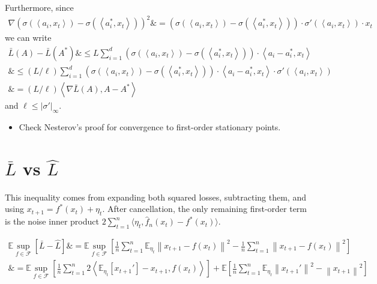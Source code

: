 \documentclass[11pt]{article}
\newcommand{\inner}[1]{\left\langle #1 \right\rangle}
\newcommand{\E}{\ensuremath{\mathbb E}}
\newcommand{\F}{\ensuremath{\mathcal F}}
\newcommand{\En}{\E}
\newcommand{\emploss}{\widehat{L}}
\newcommand{\condemploss}{\bar{L}}
\newcommand{\norm}[1]{\left\|#1\right\|}
\newcommand{\algo}{\widehat{f}_n}
\begin{document}
Furthermore, since
\begin{align}
	\nabla  (\sigma(\inner{a_i,x_t})-\sigma(\inner{a_i^*,x_t}))^2 
	\&=(\sigma(\inner{a_i,x_t})-\sigma(\inner{a_i^*,x_t})) \cdot \sigma'(\inner{a_i,x_t}) \cdot x_t 
\end{align}
we can write
\begin{align}
	\condemploss(A)-\condemploss(A^*) 
	\&\leq L \sum_{i=1}^d (\sigma(\inner{a_i,x_t})-\sigma(\inner{a_i^*,x_t})) \cdot \inner{a_i-a_i^*,x_t}\\
	\&\leq (L/\ell) \sum_{i=1}^d (\sigma(\inner{a_i,x_t})-\sigma(\inner{a_i^*,x_t})) \cdot \inner{a_i-a_i^*,x_t} \cdot \sigma'(\inner{a_i,x_t})\\
	\&= (L/\ell) \inner{\nabla \condemploss(A), A-A^*}
\end{align}
and $\ell \leq |\sigma'|_\infty$.

\begin{itemize}
	\item Check Nesterov's proof for convergence to first-order stationary points.
\end{itemize}

\section{$\condemploss$ vs $\emploss$}
%
This inequality comes from expanding both squared losses, subtracting them, and using \(x_{t+1}=f^*(x_t)+\eta_t\).
After cancellation, the only remaining first-order term is the noise inner product \(2\sum_{t=1}^n \langle \eta_t,\algo(x_t)-f^*(x_t)\rangle\).






\begin{align}
	\En\sup_{f\in\F}\left[\condemploss-\emploss\right] \&= \En\sup_{f\in\F}\left[\frac{1}{n}\sum_{t=1}^n \En_{\eta_t}\norm{x_{t+1}-f(x_t)}^2 - \frac{1}{n}\sum_{t=1}^n \norm{x_{t+1}-f(x_t)}^2 \right]\\
	\&=\En\sup_{f\in\F}\left[\frac{1}{n}\sum_{t=1}^n 2\inner{\En_{\eta_t}[x_{t+1}']-x_{t+1},f(x_t)}\right] + \En\left[\frac{1}{n}\sum_{t=1}^n \En_{\eta_t}\norm{x_{t+1}'}^2-\norm{x_{t+1}}^2 \right]
\end{align}
\end{document}
